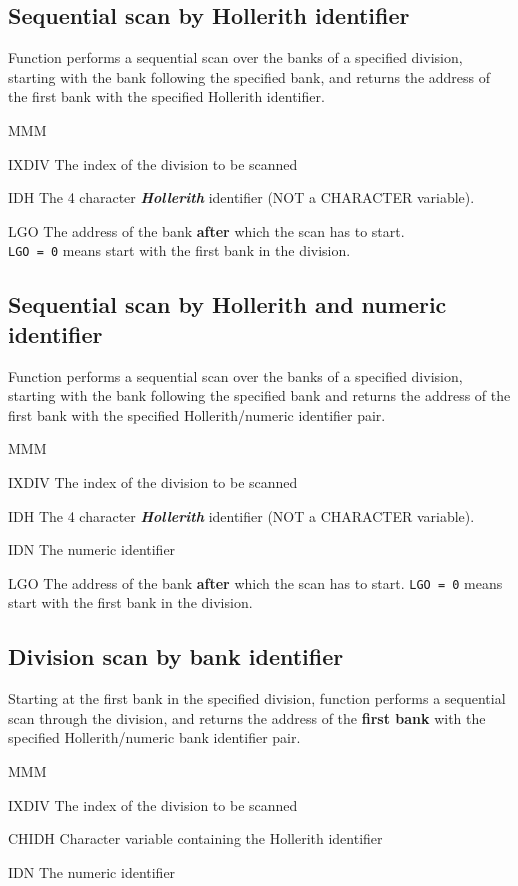 \subsection{Sequential scan by Hollerith identifier}
\par
Function  performs a sequential scan over the banks of a specified
division, starting with the bank following the specified bank,
and returns
the address of the first bank with the specified Hollerith identifier.
\Idesc
\begin{DL}{MMM}
\item[IXDIV]The index of the division to be scanned
\item[IDH]The 4 character {\bf\it Hollerith} identifier (NOT a CHARACTER
variable).
\item[LGO]The address of the bank {\bf after} which the scan has to start.\\
{\tt LGO = 0} means start with the first bank in the division.
\end{DL}
\subsection{Sequential scan by Hollerith and numeric identifier}
\par
Function  performs a sequential scan over the banks of a specified
division, starting with the bank following the specified bank and returns
the address of the first bank with the specified Hollerith/numeric
identifier pair.
\Idesc
\begin{DL}{MMM}
\item[IXDIV]The index of the division to be scanned
\item[IDH]The 4 character {\bf\it Hollerith} identifier (NOT a CHARACTER
variable).
\item[IDN]The numeric identifier
\item[LGO]The address of the bank {\bf after} which the scan has to start.
{\tt LGO = 0} means start with the first bank in the division.
\end{DL}
\subsection{Division scan by bank identifier}
\par Starting at the first bank in the specified division,
function  performs a sequential scan through the
division, and returns
the address of the {\bf first bank} with the specified
Hollerith/numeric bank identifier pair.
\Idesc
\begin{DL}{MMM}
\item[IXDIV]The index of the division to be scanned
\item[CHIDH]Character variable containing the Hollerith identifier
\item[IDN]The numeric identifier
\end{DL}
